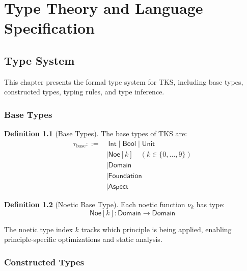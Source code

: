 \documentclass[11pt,twoside,openright]{book}
\theoremstyle{definition}
\newtheorem{definition}{Definition}[chapter]
\theoremstyle{plain}
\theoremstyle{remark}
\newcommand{\noe}[1]{\nu_{#1}}
\begin{document}

\part{Type Theory and Language Specification}

\chapter{Type System}
\label{ch:types}

This chapter presents the formal type system for TKS, including base types, constructed types, typing rules, and type inference.

\section{Base Types}

\begin{definition}[Base Types]
\label{def:base-types}
The base types of TKS are:
\begin{align}
\tau_{\text{base}} ::=&\; \mathsf{Int} \mid \mathsf{Bool} \mid \mathsf{Unit} \\
                     &\mid \mathsf{Noe}[k] \quad (k \in \{0, \ldots, 9\}) \\
                     &\mid \mathsf{Domain} \\
                     &\mid \mathsf{Foundation} \\
                     &\mid \mathsf{Aspect}
\end{align}
\end{definition}

\begin{definition}[Noetic Base Type]
\label{def:noe-base-type}
Each noetic function $\noe{k}$ has type:
\[
\mathsf{Noe}[k] : \mathsf{Domain} \to \mathsf{Domain}
\]

The noetic type index $k$ tracks which principle is being applied, enabling principle-specific optimizations and static analysis.
\end{definition}

\section{Constructed Types}
\end{document}
